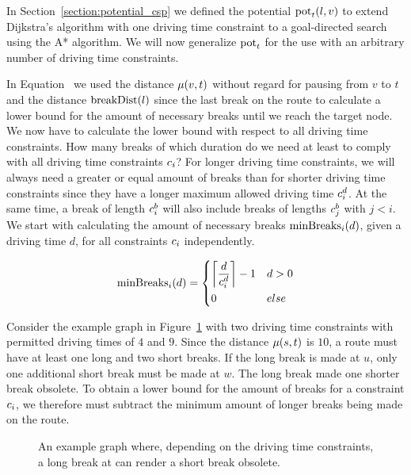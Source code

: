 In Section~\ref{section:potential_csp} we defined the potential $\concretepotential_t(l,v)$ to extend Dijkstra's algorithm with one driving time constraint to a goal-directed search using the A* algorithm. We will now generalize $\concretepotential_t$ for the use with an arbitrary number of driving time constraints.

In Equation~ we used the distance $\distance(v,t)$ without regard for pausing from $v$ to $t$ and the distance $\breakDist(l)$ since the last break on the route to calculate a lower bound for the amount of necessary breaks until we reach the target node. We now have to calculate the lower bound with respect to all driving time constraints. How many breaks of which duration do we need at least to comply with all driving time constraints $\restr_i$? For longer driving time constraints, we will always need a greater or equal amount of breaks than for shorter driving time constraints since they have a longer maximum allowed driving time $\restr_i^d$. At the same time, a break of length $\restr_i^b$ will also include breaks of lengths $\restr_j^b$ with $j < i$. We start with calculating the amount of necessary breaks $\minBreaks_i(d)$, given a driving time $d$, for all constraints $\restr_i$ independently.

\begin{align}\label{eq:min_breaks_n}
	\minBreaks_i(d) = \begin{dcases}
		\ceil*{ \frac{d}{\restr_i^d} } - 1 & d > 0 \\
		0                                  & else
	\end{dcases}
\end{align}

Consider the example graph in Figure~\ref{fig:graph_short_long_break} with two driving time constraints with permitted driving times of $4$ and $9$. Since the distance $\distance(s,t)$ is $10$, a route must have at least one long and two short breaks. If the long break is made at $u$, only one additional short break must be made at $w$. The long break made one shorter break obsolete. To obtain a lower bound for the amount of breaks for a constraint $\restr_i$, we therefore must subtract the minimum amount of longer breaks being made on the route.

\begin{figure}[hbtp]
	\centering
	
	\caption{An example graph where, depending on the driving time constraints, a long break at can render a short break obsolete.}
	\label{fig:graph_short_long_break}
\end{figure}

